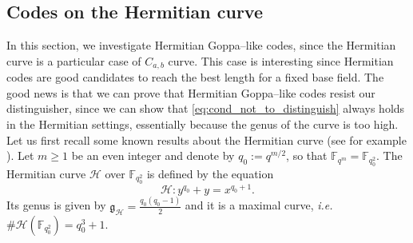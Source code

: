 \documentclass[a4paper]{article}
\theoremstyle{definition}
\theoremstyle{remark}
\newcommand{\calH}{\mathcal{H}}
\newcommand{\fqm}{\mathbb{F}_{q^m}}
\newcommand{\fqo}{\mathbb{F}_{q_0^2}}
\begin{document}
\subsection{Codes on the Hermitian curve}
In this section, we investigate Hermitian Goppa--like codes, since the Hermitian curve is a particular case of $C_{a,b}$ curve. This case is interesting since Hermitian codes are good candidates to reach the best length for a fixed base field. The good news is that we can prove that Hermitian Goppa--like codes resist our distinguisher, since we can show that \eqref{eq:cond_not_to_distinguish} always holds in the Hermitian settings, essentially because  the genus of the curve is too high. 
\noindent Let us first recall some known results about the Hermitian curve (see for example \cite{Sti09}). Let $m \geq 1$  be an even integer and denote by $q_0 := q^{m/2}$, so that $\fqm = \fqo$. The Hermitian curve $\calH$ over $\fqo$ is defined by the equation
$$\calH : y^{q_0}+y = x^{q_0+1}.$$
Its genus is given by $\mathfrak{g}_{\calH} = \frac{q_0(q_0-1)}{2}$ and it is a maximal curve, \emph{i.e.} $\#\calH(\fqo) = q_0^3+1$.
\end{document}

